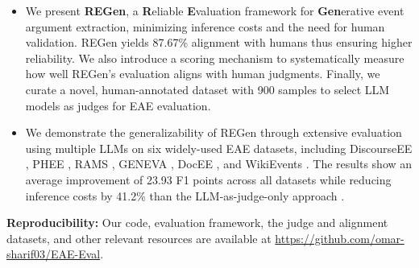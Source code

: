 \begin{itemize}
   
\item We present \textbf{REGen}, a \textbf{R}eliable \textbf{E}valuation framework for \textbf{Gen}erative event
argument extraction, minimizing inference costs and the need for human validation. REGen yields 87.67\% alignment with humans thus ensuring higher reliability. We also introduce a scoring mechanism to systematically measure how well REGen's evaluation aligns with human judgments. Finally, we curate a novel, human-annotated dataset with 900 samples to select LLM models as judges for EAE evaluation. %

\item We demonstrate the generalizability of REGen through extensive evaluation using multiple LLMs on six widely-used EAE datasets, including DiscourseEE \cite{sharif-etal-2024-explicit}, PHEE \cite{sun-etal-2022-phee}, RAMS \cite{ebner-etal-2020-multi}, GENEVA \cite{parekh-etal-2023-geneva}, DocEE \cite{tong-etal-2022-docee}, and WikiEvents \cite{li-etal-2021-document}. The results show an average improvement of 23.93 F1 points across all datasets while reducing inference costs by 41.2\% than the LLM-as-judge-only approach \cite{lu2024exactmatchsemanticallyreassessing}.


\end{itemize}

\noindent
\textbf{Reproducibility:} Our code, evaluation framework, the judge and alignment datasets, and other relevant resources are available at \href{https://github.com/omar-sharif03/EAE-Eval}{https://github.com/omar-sharif03/EAE-Eval}.


